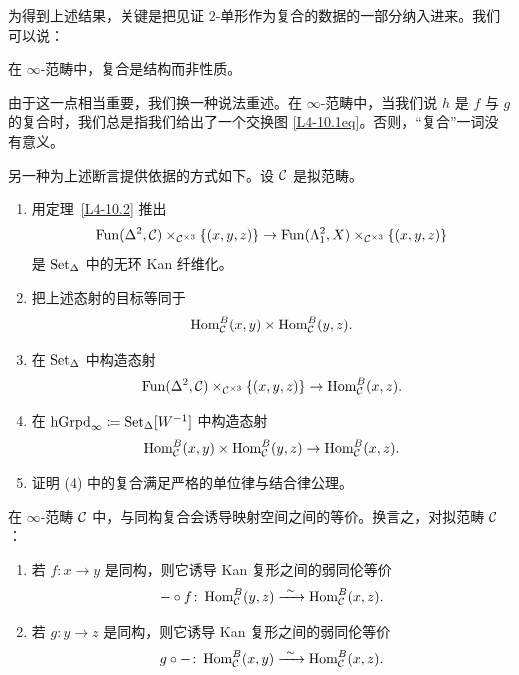 
\nitem\label{L4-10.4} 为得到上述结果，关键是把见证 $2$-单形作为复合的数据的一部分纳入进来。我们可以说：

\begin{slogan}\label{L4-10.5}\centering\par
在 $\infty$-范畴中，复合是结构而非性质。
\end{slogan}

\nitem\label{L4-10.6} 由于这一点相当重要，我们换一种说法重述。在 $\infty$-范畴中，当我们说 $h$ 是 $f$ 与 $g$ 的复合时，我们总是指我们给出了一个交换图 \eqref{L4-10.1eq}。否则，“复合”一词没有意义。

\begin{exercise}\label{L4-10.7}
另一种为上述断言提供依据的方式如下。设 $\mathcal{C}$ 是拟范畴。
\begin{enumerate}[label=(\arabic*),leftmargin=2.4em,itemsep=0.1em]
\item 用定理~\ref{L4-10.2} 推出
\[
\operatorname{Fun}(\Delta^2,\mathcal{C})\times_{\mathcal{C}^{\times 3}}\{(x,y,z)\}\to\operatorname{Fun}(\Lambda^2_1,X)\times_{\mathcal{C}^{\times 3}}\{(x,y,z)\}
\]
是 $\operatorname{Set}_\Delta$ 中的无环 Kan 纤维化。
\item 把上述态射的目标等同于
\[
\operatorname{Hom}^{B}_{\mathcal{C}}(x,y)\times\operatorname{Hom}^{B}_{\mathcal{C}}(y,z).
\]
\item 在 $\operatorname{Set}_\Delta$ 中构造态射
\[
\operatorname{Fun}(\Delta^2,\mathcal{C})\times_{\mathcal{C}^{\times 3}}\{(x,y,z)\}\to\operatorname{Hom}^{B}_{\mathcal{C}}(x,z).
\]
\item 在 $\operatorname{hGrpd}_\infty\coloneqq\operatorname{Set}_\Delta[W^{-1}]$ 中构造态射
\[
\operatorname{Hom}^{B}_{\mathcal{C}}(x,y)\times\operatorname{Hom}^{B}_{\mathcal{C}}(y,z)\to\operatorname{Hom}^{B}_{\mathcal{C}}(x,z).
\]
\item 证明 (4) 中的复合满足严格的单位律与结合律公理。
\end{enumerate}
\end{exercise}

\begin{exercise}\label{L4-10.8}
在 $\infty$-范畴 $\mathcal{C}$ 中，与同构复合会诱导映射空间之间的等价。换言之，对拟范畴 $\mathcal{C}$：
\begin{enumerate}[label=(\arabic*),leftmargin=2.4em,itemsep=0.1em]
\item 若 $f\colon x\to y$ 是同构，则它诱导 Kan 复形之间的弱同伦等价
\[
-\circ f\colon\Hom^{B}_{\cC}(y,z)\xrightarrow{\ \sim\ }\Hom^{B}_{\cC}(x,z).
\]
\item 若 $g\colon y\to z$ 是同构，则它诱导 Kan 复形之间的弱同伦等价
\[
g\circ -\colon\Hom^{B}_{\cC}(x,y)\xrightarrow{\ \sim\ }\Hom^{B}_{\cC}(x,z).
\]
\end{enumerate}
\end{exercise}

